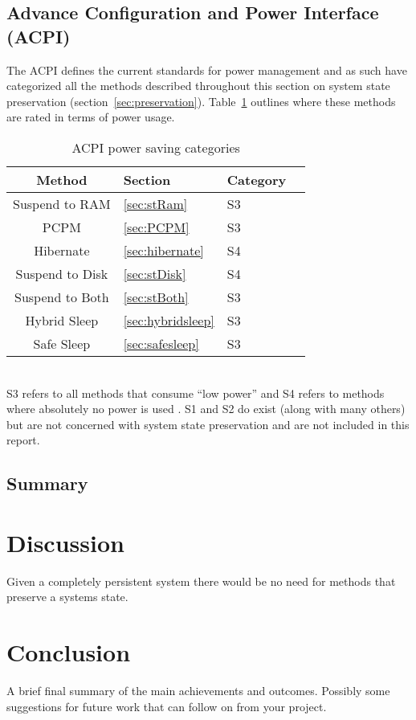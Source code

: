 \documentclass[a4,12pt]{article}
\begin{document}
\subsection{Advance Configuration and Power Interface (ACPI)}
The ACPI defines the current standards for power management \citep{ACPI} and as such have categorized all the methods described throughout this section on system state preservation (section~\ref{sec:preservation}). Table~\ref{table:categories} outlines where these methods are rated in terms of power usage.
\begin{table}[h!]
    \begin{center}
        \leavevmode
        \begin{tabular}{|cll|l|}\hline
            Method & Section & Category\\[0.1cm]\hline
            Suspend to RAM & \ref{sec:stRam} & S3\\
            PCPM & \ref{sec:PCPM} & S3 \\
            Hibernate & \ref{sec:hibernate} & S4\\
            Suspend to Disk & \ref{sec:stDisk} & S4 \\
            Suspend to Both & \ref{sec:stBoth} & S3 \\
            Hybrid Sleep & \ref{sec:hybridsleep} & S3 \\
            Safe Sleep & \ref{sec:safesleep} & S3 \\\hline
        \end{tabular}
    \end{center}
    \caption{ACPI power saving categories \citep{ACPI}}
    \label{table:categories}
\end{table}
\\S3 refers to all methods that consume ``low power'' and S4 refers to methods where absolutely no power is used \citep{ACPI}. S1 and S2 do exist (along with many others) but are not concerned with system state preservation and are not included in this report.
\subsection{Summary}
\newpage
\section{Discussion}\label{sec:discussion}
Given a completely persistent system there would be no need for methods that preserve a systems state.
%
\section{Conclusion}
%
A brief final summary of the main achievements and outcomes. Possibly some suggestions for future work that can follow on from your project.%
%
\end{document}
